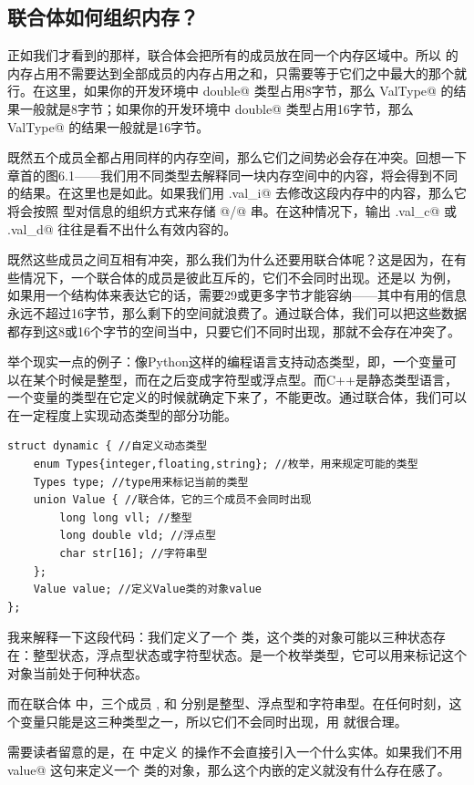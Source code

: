 \subsection*{联合体如何组织内存？}
正如我们才看到的那样，联合体会把所有的成员放在同一个内存区域中。所以 \lstinline@ValType@ 的内存占用不需要达到全部成员的内存占用之和，只需要等于它们之中最大的那个就行。在这里，如果你的开发环境中 \lstinline@long double@ 类型占用8字节，那么 \lstinline@sizeof ValType@ 的结果一般就是8字节；如果你的开发环境中 \lstinline@long double@ 类型占用16字节，那么 \lstinline@sizeof ValType@ 的结果一般就是16字节。\par
既然五个成员全都占用同样的内存空间，那么它们之间势必会存在冲突。回想一下章首的图6.1——我们用不同类型去解释同一块内存空间中的内容，将会得到不同的结果。在这里也是如此。如果我们用 \lstinline@a.val_i@ 去修改这段内存中的内容，那么它将会按照 \lstinline@int@ 型对信息的组织方式来存储 @/@ 串。在这种情况下，输出 \lstinline@a.val_c@ 或 \lstinline@a.val_d@ 往往是看不出什么有效内容的。\par
既然这些成员之间互相有冲突，那么我们为什么还要用联合体呢？这是因为，在有些情况下，一个联合体的成员是彼此互斥的，它们不会同时出现。还是以 \lstinline@ValType@ 为例，如果用一个结构体来表达它的话，需要29或更多字节才能容纳——其中有用的信息永远不超过16字节，那么剩下的空间就浪费了。通过联合体，我们可以把这些数据都存到这8或16个字节的空间当中，只要它们不同时出现，那就不会存在冲突了。\par
举个现实一点的例子：像Python这样的编程语言支持动态类型，即，一个变量可以在某个时候是整型，而在之后变成字符型或浮点型。而C++是静态类型语言，一个变量的类型在它定义的时候就确定下来了，不能更改。通过联合体，我们可以在一定程度上实现动态类型的部分功能。\par
\begin{lstlisting}
struct dynamic { //自定义动态类型
    enum Types{integer,floating,string}; //枚举，用来规定可能的类型
    Types type; //type用来标记当前的类型
    union Value { //联合体，它的三个成员不会同时出现
        long long vll; //整型
        long double vld; //浮点型
        char str[16]; //字符串型
    };
    Value value; //定义Value类的对象value
};
\end{lstlisting}\par
我来解释一下这段代码：我们定义了一个 \lstinline@dynamic@ 类，这个类的对象可能以三种状态存在：整型状态，浮点型状态或字符型状态。\lstinline@type@ 是一个枚举类型，它可以用来标记这个对象当前处于何种状态。\par
而在联合体 \lstinline@Value@ 中，三个成员 \lstinline@vll@, \lstinline@vld@ 和 \lstinline@str@ 分别是整型、浮点型和字符串型。在任何时刻，这个变量只能是这三种类型之一，所以它们不会同时出现，用 \lstinline@union@ 就很合理。\par
需要读者留意的是，在 \lstinline@dynamic@ 中定义 \lstinline@Value@ 的操作不会直接引入一个什么实体。如果我们不用 \lstinline@Value value@ 这句来定义一个 \lstinline@Value@ 类的对象，那么这个内嵌的定义就没有什么存在感了。\par
